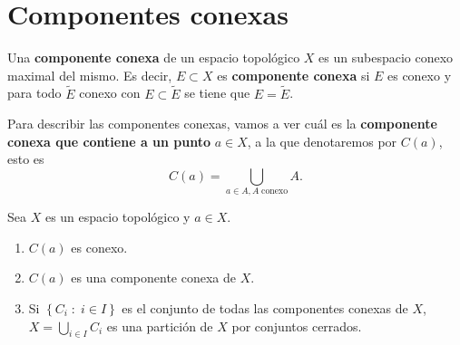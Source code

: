 \section{Componentes conexas}
\begin{definition}
	Una \textbf{componente conexa} de un espacio topológico $\displaystyle X $ es un subespacio conexo maximal del mismo. Es decir, $\displaystyle E \subset X $ es \textbf{componente conexa} si $\displaystyle E $ es conexo y para todo $\displaystyle \tilde{E} $ conexo con $\displaystyle E\subset \tilde{E} $ se tiene que $\displaystyle E = \tilde{E} $. 
\end{definition}
\begin{notation}
Para describir las componentes conexas, vamos a ver cuál es la \textbf{componente conexa que contiene a un punto} $\displaystyle a \in X $, a la que denotaremos por $\displaystyle C\left(a\right) $, esto es
\[C\left(a\right)=\bigcup_{a \in A, A\; \text{conexo}}A .\]
\end{notation}
\begin{prop}
Sea $\displaystyle X $ es un espacio topológico y $\displaystyle a \in X $.
\begin{enumerate}
\item $\displaystyle C\left(a\right) $ es conexo.
\item $\displaystyle C\left(a\right) $ es una componente conexa de $\displaystyle X $. 
\item Si $\displaystyle \left\{ C_{i} \; : \; i \in I\right\}  $ es el conjunto de todas las componentes conexas de $\displaystyle X $, $\displaystyle X = \bigcup_{i \in I}C_{i} $ es una partición de $\displaystyle X $ por conjuntos cerrados.
\end{enumerate}
\end{prop}
